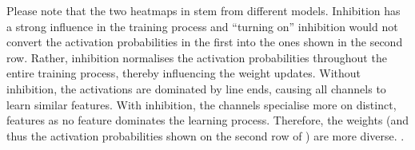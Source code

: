 Please note that the two heatmaps in  stem from different models.
Inhibition has a strong influence in the training process and ``turning on'' inhibition would not convert the activation probabilities in the first into the ones shown in the second row.
Rather, inhibition normalises the activation probabilities throughout the entire training process, thereby influencing the weight updates.
Without inhibition, the activations are dominated by line ends, causing all channels to learn similar features.
With inhibition, the channels specialise more on distinct, features as no feature dominates the learning process. Therefore, the weights (and thus the activation probabilities shown on the second row of ) are more diverse.
.







